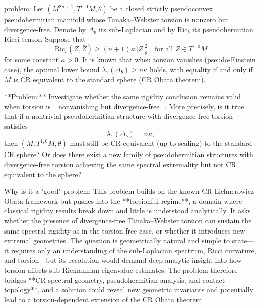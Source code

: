 problem:  
Let \((M^{2n+1}, T^{1,0}M, \theta)\) be a closed strictly pseudoconvex pseudohermitian manifold whose Tanaka–Webster torsion is nonzero but divergence-free. Denote by \(\Delta_b\) its sub-Laplacian and by \(\mathrm{Ric}_b\) its pseudohermitian Ricci tensor. Suppose that  
\[
\mathrm{Ric}_b(Z, \bar Z) \ge (n+1)\kappa\,|Z|^2_\theta \quad \text{for all } Z \in T^{1,0}M
\]
for some constant \(\kappa > 0\).  
It is known that when torsion vanishes (pseudo-Einstein case), the optimal lower bound \(\lambda_1(\Delta_b) \ge n\kappa\) holds, with equality if and only if \(M\) is CR equivalent to the standard sphere (CR Obata theorem).  

**Problem:**  
Investigate whether the same rigidity conclusion remains valid when torsion is _nonvanishing but divergence-free_. More precisely, is it true that if a nontrivial pseudohermitian structure with divergence-free torsion satisfies  
\[
\lambda_1(\Delta_b) = n\kappa,
\]  
then \((M, T^{1,0}M, \theta)\) must still be CR equivalent (up to scaling) to the standard CR sphere?  
Or does there exist a new family of pseudohermitian structures with divergence-free torsion achieving the same spectral extremality but not CR equivalent to the sphere?  

Why is it a "good" problem:  
This problem builds on the known CR Lichnerowicz–Obata framework but pushes into the **torsionful regime**, a domain where classical rigidity results break down and little is understood analytically. It asks whether the presence of divergence-free Tanaka–Webster torsion can sustain the same spectral rigidity as in the torsion-free case, or whether it introduces new extremal geometries. The question is geometrically natural and simple to state—it requires only an understanding of the sub-Laplacian spectrum, Ricci curvature, and torsion—but its resolution would demand deep analytic insight into how torsion affects sub-Riemannian eigenvalue estimates. The problem therefore bridges **CR spectral geometry, pseudohermitian analysis, and contact topology**, and a solution could reveal new geometric invariants and potentially lead to a torsion-dependent extension of the CR Obata theorem.